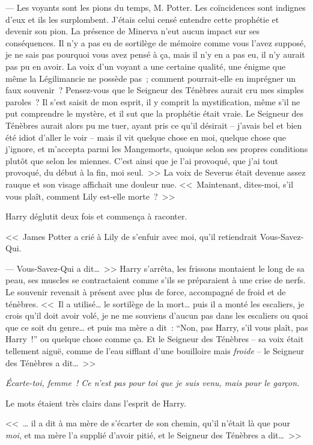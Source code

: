 --- Les voyants sont les pions du temps, M. Potter. Les coïncidences sont indignes d'eux et ils les surplombent. J'étais celui censé entendre cette prophétie et devenir son pion. La présence de Minerva n'eut aucun impact sur ses conséquences. Il n'y a pas eu de sortilège de mémoire comme vous l'avez supposé, je ne sais pas pourquoi vous avez pensé à ça, mais il n'y en a pas eu, il n'y aurait pas pu en avoir. La voix d'un voyant a une certaine qualité, une énigme que même la Légilimancie ne possède pas~; comment pourrait-elle en imprégner un faux souvenir~? Pensez-vous que le Seigneur des Ténèbres aurait cru mes simples paroles~? Il s'est saisit de mon esprit, il y comprit la mystification, même s'il ne put comprendre le mystère, et il sut que la prophétie était vraie. Le Seigneur des Ténèbres aurait alors pu me tuer, ayant pris ce qu'il désirait -- j'avais bel et bien été idiot d'aller le voir -- mais il vit quelque chose en moi, quelque chose que j'ignore, et m'accepta parmi les Mangemorts, quoique selon ses propres conditions plutôt que selon les miennes. C'est ainsi que je l'ai provoqué, que j'ai tout provoqué, du début à la fin, moi seul.~>> La voix de Severus était devenue assez rauque et son visage affichait une douleur nue. <<~Maintenant, dites-moi, s'il vous plaît, comment Lily est-elle morte~?~>>

Harry déglutit deux fois et commença à raconter.

<<~James Potter a crié à Lily de s'enfuir avec moi, qu'il retiendrait Vous-Savez-Qui.

--- Vous-Savez-Qui a dit…~>> Harry s'arrêta, les frissons montaient le long de sa peau, ses muscles se contractaient comme s'ils se préparaient à une crise de nerfs. Le souvenir revenait à présent avec plus de force, accompagné de froid et de ténèbres. <<~Il a utilisé… le sortilège de la mort… puis il a monté les escaliers, je crois qu'il doit avoir volé, je ne me souviens d'aucun pas dans les escaliers ou quoi que ce soit du genre… et puis ma mère a dit~: “Non, pas Harry, s'il vous plaît, pas Harry~!” ou quelque chose comme ça. Et le Seigneur des Ténèbres -- sa voix était tellement aiguë, comme de l'eau sifflant d'une bouilloire mais \emph{froide} -- le Seigneur des Ténèbres a dit…~>>

\emph{Écarte-toi, femme~! Ce n'est pas pour toi que je suis venu, mais pour le garçon.}

Le mots étaient très clairs dans l'esprit de Harry.

<<~… il a dit à ma mère de s'écarter de son chemin, qu'il n'était là que pour \emph{moi}, et ma mère l'a supplié d'avoir pitié, et le Seigneur des Ténèbres a dit…~>>

